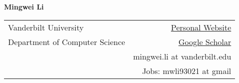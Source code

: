 \documentclass[letterpaper,11pt,oneside]{article}
\begin{document}

\noindent  \LARGE{\textbf{Mingwei Li}}  \\
\vspace{-2ex}
\normalsize


\begin{center}
\begin{tabular}{l r}
Vanderbilt University & \hspace{3in} \href{https://tiga1231.github.io/}{Personal Website} \\
Department of Computer Science & \href{https://scholar.google.com/citations?user=CHuXIuIAAAAJ}{Google Scholar} \\
                                    & mingwei.li at vanderbilt.edu \\
                                    & Jobs: mwli93021 at gmail
\end{tabular}
\end{center}

\vspace{1em}

\end{document}
